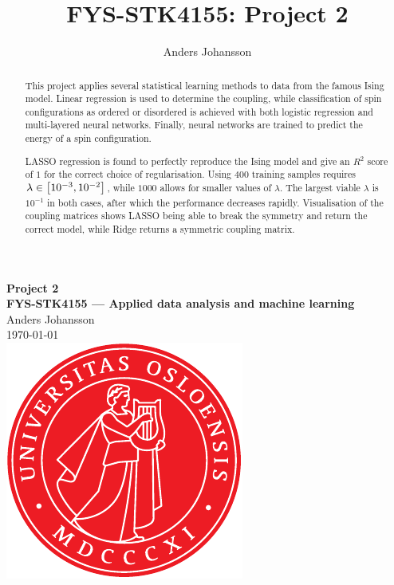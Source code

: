 \documentclass[11pt,british,a4paper]{article}
\numberwithin{equation}{section}
\begin{document}
\tikzexternaldisable
\title{FYS-STK4155: Project 2}
\author{Anders Johansson}

\begin{titlepage}
\vspace*{\fill}
\begin{center}
\textsf{
    \Huge \textbf{Project 2}\\\vspace{0.5cm}
    \Large \textbf{FYS-STK4155 --- Applied data analysis and machine learning}\\
    \vspace{8cm}
    Anders Johansson\\
    \today\\
}
\vspace{1.5cm}
\includegraphics{uio.pdf}\\
\vspace*{\fill}
\end{center}
\end{titlepage}
\null
\pagestyle{empty}
\newpage

\pagestyle{fancy}
\setcounter{page}{1}

\begin{abstract}
    This project applies several statistical learning methods to data from the famous Ising model.
    Linear regression is used to determine the coupling, while classification of spin configurations as ordered or disordered is achieved with both logistic regression and multi-layered neural networks.
    Finally, neural networks are trained to predict the energy of a spin configuration.

    LASSO regression is found to perfectly reproduce the Ising model and give an \(R^2\) score of \(1\) for the correct choice of regularisation.
    Using \(\num{400}\) training samples requires \(\lambda\in\qty[10^{-3},10^{-2}]\), while \(\num{1000}\) allows for smaller values of \(\lambda\).
    The largest viable \(\lambda\) is \(10^{-1}\) in both cases, after which the performance decreases rapidly.
    Visualisation of the coupling matrices shows LASSO being able to break the symmetry and return the correct model, while Ridge returns a symmetric coupling matrix.
\end{abstract}
\end{document}
